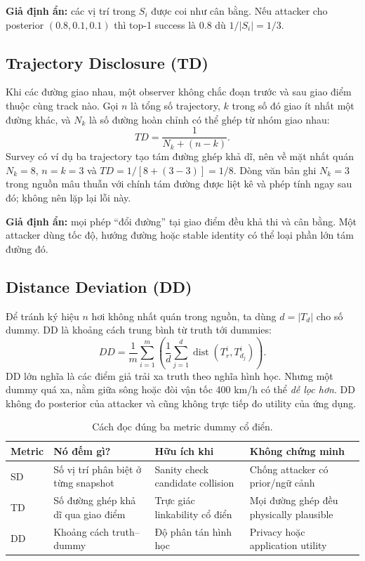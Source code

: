 \documentclass[11pt,a4paper,oneside]{report}
\begin{document}
\textbf{Giả định ẩn:} các vị trí trong $S_i$ được coi như cân bằng. Nếu attacker
cho posterior $(0.8,0.1,0.1)$ thì top-1 success là 0.8 dù $1/|S_i|=1/3$.

\subsection{Trajectory Disclosure (TD)}

Khi các đường giao nhau, một observer không chắc đoạn trước và sau giao điểm thuộc
cùng track nào. Gọi $n$ là tổng số trajectory, $k$ trong số đó giao ít nhất một đường
khác, và $N_k$ là số đường hoàn chỉnh có thể ghép từ nhóm giao nhau:
\[
TD=\frac{1}{N_k+(n-k)}.
\]
Survey có ví dụ ba trajectory tạo tám đường ghép khả dĩ, nên về mặt nhất quán
$N_k=8$, $n=k=3$ và $TD=1/[8+(3-3)]=1/8$. Dòng văn bản ghi $N_k=3$ trong nguồn
mâu thuẫn với chính tám đường được liệt kê và phép tính ngay sau đó; không nên lặp
lại lỗi này.

\textbf{Giả định ẩn:} mọi phép ``đổi đường'' tại giao điểm đều khả thi và cân bằng.
Một attacker dùng tốc độ, hướng đường hoặc stable identity có thể loại phần lớn tám
đường đó.

\subsection{Distance Deviation (DD)}

Để tránh ký hiệu $n$ hơi không nhất quán trong nguồn, ta dùng $d=|T_d|$ cho số
dummy. DD là khoảng cách trung bình từ truth tới dummies:
\[
DD=\frac{1}{m}\sum_{i=1}^{m}
\left(\frac{1}{d}\sum_{j=1}^{d}
\operatorname{dist}(T_r^i,T_{d_j}^i)\right).
\]
DD lớn nghĩa là các điểm giả trải xa truth theo nghĩa hình học. Nhưng một dummy
quá xa, nằm giữa sông hoặc đòi vận tốc 400 km/h có thể \emph{dễ lọc hơn}. DD không
đo posterior của attacker và cũng không trực tiếp đo utility của ứng dụng.

\begin{table}[htbp]
\centering
\small
\caption{Cách đọc đúng ba metric dummy cổ điển.}
\label{tab:classic-dummy-metrics}
\begin{tabularx}{\textwidth}{P{2.0cm}P{3.6cm}Y Y}
\toprule
\textbf{Metric} & \textbf{Nó đếm gì?} & \textbf{Hữu ích khi} & \textbf{Không chứng minh}\\
\midrule
SD & Số vị trí phân biệt ở từng snapshot & Sanity check candidate collision & Chống attacker có prior/ngữ cảnh\\
TD & Số đường ghép khả dĩ qua giao điểm & Trực giác linkability cổ điển & Mọi đường ghép đều physically plausible\\
DD & Khoảng cách truth--dummy & Độ phân tán hình học & Privacy hoặc application utility\\
\bottomrule
\end{tabularx}
\end{table}
\end{document}
